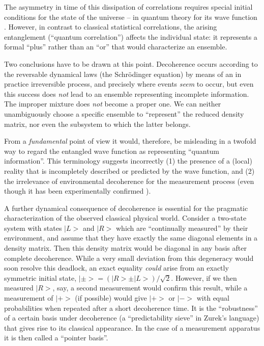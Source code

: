 \documentclass[12pt]{article}
\begin{document}
The asymmetry in time of
this dissipation of correlations requires special initial conditions
for the state of the universe -- in quantum theory for its
wave function \cite{TD}.  However, in contrast to classical
statistical correlations, the arising entanglement
(``quantum correlation'') affects the individual state:  it represents
a formal ``plus'' rather than an ``or'' that would characterize an
ensemble.

Two conclusions have to be drawn at this point. Decoherence occurs
according to the reversable dynamical laws (the Schr\"odinger
equation) by means of an in practice irreversible process, and
precisely where events {\it seem} to occur, but even this success does
{\it not} lead to an ensemble representing incomplete information. The
improper mixture does {\it not} become a proper one. We can neither
unambiguously choose a specific ensemble to ``represent'' the reduced
density matrix, nor even the  subsystem to which the latter belongs.

 From a {\it fundamental} point of view it would, therefore, be
misleading in a twofold way to regard the entangled wave function as
representing ``quantum information''. This terminology suggests
incorrectly (1) the presence of a (local) reality that is
incompletely described or predicted by the wave function, and (2) the
irrelevance of environmental decoherence  for the measurement process
(even though it has been experimentally confirmed
\cite{haroche}).

A further dynamical consequence of decoherence is essential for the
pragmatic characterization of the observed classical physical world.
Consider a two-state system with states $|L>$ and $|R>$ which are
``continually measured'' by their environment, and assume that they
have exactly the same diagonal elements in a density matrix. Then this
density matrix would be diagonal in any basis after complete
decoherence. While a very small deviation from this degeneracy would
soon resolve this deadlock, an exact equality {\it could} arise from
an exactly symmetric initial state,
$|\pm> = (|R>
\pm |L>)/\sqrt{2}$. However, if we then
measured
$|R>$, say, a second measurement would confirm this result, while a
measurement of
$|+>$ (if possible) would give $|+>$ or
$|->$ with equal probabilities when repeated after a short decoherence
time. It is the ``robustness'' of a certain basis  under decoherence
(a ``predictability sieve'' in Zurek's language)
that
gives rise to its classical appearance. In the case of a measurement
apparatus it is then called a ``pointer basis''.
\end{document}
